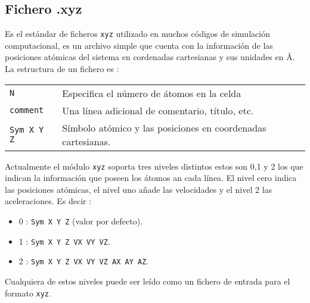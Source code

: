 \subsection{Fichero .xyz}

Es el est\'andar de ficheros \verb|xyz| utilizado en muchos c\'odigos de simulaci\'on computacional, es un archivo simple que cuenta con la informaci\'on de las posiciones at\'omicas del sistema en cordenadas cartesianas y sus unidades en \AA. La estructura de un fichero es :



\begin{center}
\begin{tabular}{l|l}
 \verb|N| & Especifica el n\'umero de \'atomos en la celda \\
 \verb|comment| & Una l\'inea adicional de comentario, t\'itulo, etc. \\
 \verb|Sym X Y Z| & S\'imbolo at\'omico y las posiciones en coordenadas cartesianas. \\
\end{tabular}
\end{center}


Actualmente el m\'odulo \verb|xyz| soporta tres niveles distintos estos son 0,1 y 2 los que indican la informaci\'on que poseen los \'atomos an cada l\'inea. El nivel cero indica las posiciones at\'omicas, el nivel uno a\~nade las velocidades y el nivel 2 las aceleraciones. Es decir :


\begin{itemize}
\item 0 : \verb|Sym X Y Z| (valor por defecto).
\item 1 : \verb|Sym X Y Z VX VY VZ|.
\item 2 : \verb|Sym X Y Z VX VY VZ AX AY AZ|.
\end{itemize}

Cualquiera de estos niveles puede ser le\'ido como un fichero de entrada para el formato \verb|xyz|.



